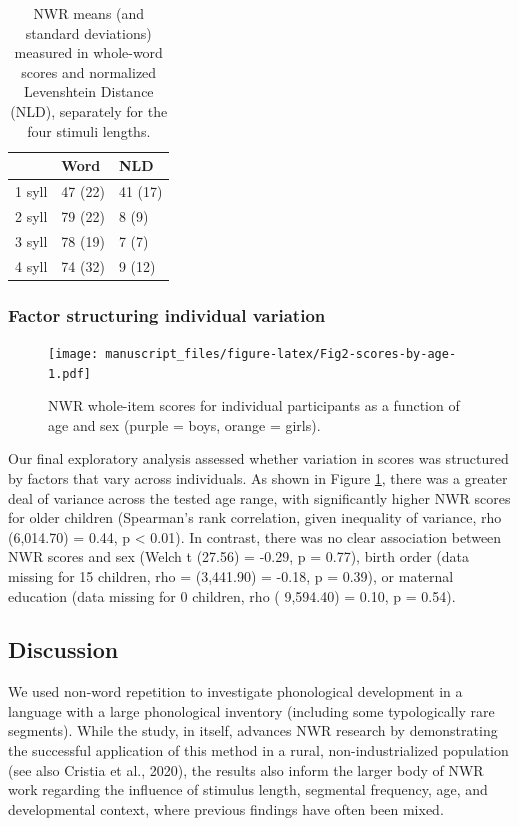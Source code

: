 \documentclass[english,,man,floatsintext]{apa6}
\begin{document}
\begin{table}

\caption{\label{tab:tablength}NWR means (and standard deviations) measured in whole-word scores and normalized Levenshtein Distance (NLD), separately for the four stimuli lengths.}
\centering
\begin{tabular}[t]{lll}
\toprule
  & Word & NLD\\
\midrule
1 syll & 47 (22) & 41 (17)\\
2 syll & 79 (22) & 8 (9)\\
3 syll & 78 (19) & 7 (7)\\
4 syll & 74 (32) & 9 (12)\\
\bottomrule
\end{tabular}
\end{table}

\hypertarget{factor-structuring-individual-variation}{%
\subsubsection{Factor structuring individual variation}\label{factor-structuring-individual-variation}}

\begin{figure}
\centering
\texttt{[image: manuscript\_files/figure-latex/Fig2-scores-by-age-1.pdf]}
\caption{\label{fig:Fig2-scores-by-age}NWR whole-item scores for individual participants as a function of age and sex (purple = boys, orange = girls).}
\end{figure}

Our final exploratory analysis assessed whether variation in scores was structured by factors that vary across individuals. As shown in Figure \ref{fig:Fig2-scores-by-age}, there was a greater deal of variance across the tested age range, with significantly higher NWR scores for older children (Spearman's rank correlation, given inequality of variance, rho (6,014.70) = 0.44, p \textless{} 0.01). In contrast, there was no clear association between NWR scores and sex (Welch t (27.56) = -0.29, p = 0.77), birth order (data missing for 15 children, rho = (3,441.90) = -0.18, p = 0.39), or maternal education (data missing for 0 children, rho ( 9,594.40) = 0.10, p = 0.54).

\hypertarget{discussion}{%
\subsection{Discussion}\label{discussion}}

We used non-word repetition to investigate phonological development in a language with a large phonological inventory (including some typologically rare segments). While the study, in itself, advances NWR research by demonstrating the successful application of this method in a rural, non-industrialized population (see also Cristia et al., 2020), the results also inform the larger body of NWR work regarding the influence of stimulus length, segmental frequency, age, and developmental context, where previous findings have often been mixed.
\end{document}
